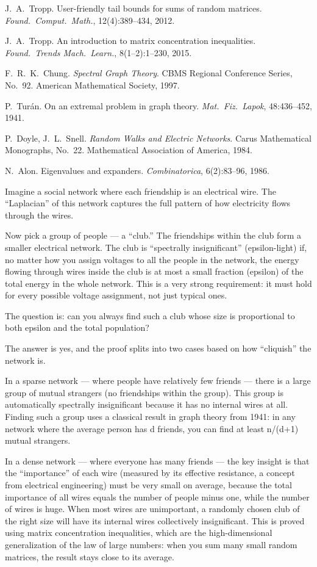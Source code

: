  J.~A.~Tropp.
User-friendly tail bounds for sums of random matrices.
\emph{Found.\ Comput.\ Math.}, 12(4):389--434, 2012.

 J.~A.~Tropp.
An introduction to matrix concentration inequalities.
\emph{Found.\ Trends Mach.\ Learn.}, 8(1--2):1--230, 2015.

 F.~R.~K.~Chung.
\emph{Spectral Graph Theory}. CBMS Regional Conference Series, No.~92.
American Mathematical Society, 1997.

 P.~Tur\'an.
On an extremal problem in graph theory.
\emph{Mat.\ Fiz.\ Lapok}, 48:436--452, 1941.

 P.~Doyle, J.~L.~Snell.
\emph{Random Walks and Electric Networks}. Carus Mathematical
Monographs, No.~22. Mathematical Association of America, 1984.

 N.~Alon.
Eigenvalues and expanders. \emph{Combinatorica}, 6(2):83--96, 1986.


Imagine a social network where each friendship is an electrical wire. The ``Laplacian'' of this network captures the full pattern of how electricity flows through the wires.

Now pick a group of people --- a ``club.'' The friendships within the club form a smaller electrical network. The club is ``spectrally insignificant'' (epsilon-light) if, no matter how you assign voltages to all the people in the network, the energy flowing through wires inside the club is at most a small fraction (epsilon) of the total energy in the whole network. This is a very strong requirement: it must hold for every possible voltage assignment, not just typical ones.

The question is: can you always find such a club whose size is proportional to both epsilon and the total population?

The answer is yes, and the proof splits into two cases based on how ``cliquish'' the network is.

In a sparse network --- where people have relatively few friends --- there is a large group of mutual strangers (no friendships within the group). This group is automatically spectrally insignificant because it has no internal wires at all. Finding such a group uses a classical result in graph theory from 1941: in any network where the average person has d friends, you can find at least n/(d+1) mutual strangers.

In a dense network --- where everyone has many friends --- the key insight is that the ``importance'' of each wire (measured by its effective resistance, a concept from electrical engineering) must be very small on average, because the total importance of all wires equals the number of people minus one, while the number of wires is huge. When most wires are unimportant, a randomly chosen club of the right size will have its internal wires collectively insignificant. This is proved using matrix concentration inequalities, which are the high-dimensional generalization of the law of large numbers: when you sum many small random matrices, the result stays close to its average.

